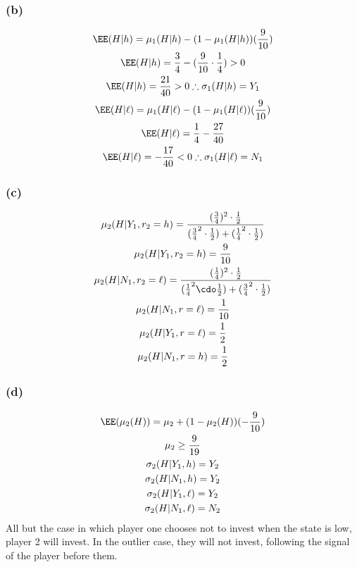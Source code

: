 \documentclass[10pt, a4paper]{article}
\begin{document}
      \subsubsection*{(b)}
        \begin{gather*}
          \EE(H|h) = \mu_1(H|h) - (1-\mu_1(H|h))(\frac{9}{10}) \\
          \EE(H|h) = \frac{3}{4} - (\frac{9}{10}\cdot\frac{1}{4}) > 0 \\
          \EE(H|h) = \frac{21}{40} > 0 \therefore \sigma_1(H|h) = Y_1 \\
          \EE(H|\ell) = \mu_1(H|\ell) - (1-\mu_1(H|\ell))(\frac{9}{10}) \\
          \EE(H|\ell) = \frac{1}{4} - \frac{27}{40} \\
          \EE(H|\ell) = -\frac{17}{40} < 0 \therefore \sigma_1(H|\ell) = N_1 \\
        \end{gather*}
      \subsubsection*{(c)}
        \begin{gather*}
          \mu_2(H|Y_1, r_2=h) = \frac{(\frac{3}{4})^2\cdot\frac{1}{2}}{(\frac{3}{4}^2\cdot\frac{1}{2})+(\frac{1}{4}^2\cdot\frac{1}{2})} \\
          \mu_2(H|Y_1, r_2=h) = \frac{9}{10} \\
          \mu_2(H|N_1, r_2=\ell) = \frac{(\frac{1}{4})^2\cdot\frac{1}{2}}{(\frac{1}{4}^2\cdo\frac{1}{2})+(\frac{3}{4}^2\cdot\frac{1}{2})} \\
          \mu_2(H|N_1, r=\ell) = \frac{1}{10} \\
          \mu_2(H|Y_1, r=\ell) = \frac{1}{2} \\
          \mu_2(H|N_1, r=h) = \frac{1}{2}
        \end{gather*}
      \subsubsection*{(d)}
        \begin{gather*}
          \EE(\mu_2(H)) = \mu_2+(1-\mu_2(H))(-\frac{9}{10}) \\
          \mu_2 \geq \frac{9}{19} \\
          \sigma_2(H|Y_1,h) = Y_2 \\
          \sigma_2(H|N_1,h) = Y_2 \\
          \sigma_2(H|Y_1, \ell) = Y_2 \\
          \sigma_2(H|N_1, \ell) = N_2 \\
        \end{gather*}
        All but the case in which player one chooses not to invest when the state is low, player 2 will invest. In the outlier case, they will not invest, following the signal of the player before them. 
\end{document}
